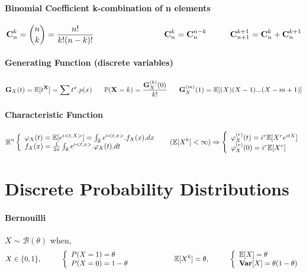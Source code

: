\documentclass[a4paper,10pt]{article}
\begin{document}
\paragraph{Binomial Coefficient k-combination of n elements}
\[
\textbf{C}^{k}_{n} = \binom{n}{k} = \frac{n!}{k!(n-k)!}
\hspace{30mm} \textbf{C}^{k}_{n} = \textbf{C}^{n-k}_{n} 
\hspace{10mm} \textbf{C}^{k+1}_{n+1} = \textbf{C}^{k}_{n} + \textbf{C}^{k+1}_{n} 
\]

\paragraph{Generating Function (discrete variables)}
\[
\textbf{G}_{X}(t)= \mathbb{E}[t^{\textbf{X}}] = \sum t^{x}.p(x)
\hspace{6mm} \mathbb{P}(\textbf{X}=k) = \frac{\textbf{G}_{X}^{(k)}(0)}{k!}
\hspace{6mm} \textbf{G}_{X}^{(m)}(1)  = \mathbb{E}[(X)(X-1)...(X-m+1)]
\]
\paragraph{Characteristic Function}
\[
\mathbb{R}^{n}
\left\{
\begin{array}{l}
\varphi_{X}(t)= \mathbb{E}[e^{i<t,X>}] = \int_{\mathbb{R}} e^{i<t,x>} . f_{X}(x).dx \\
f_{X}(x) = \frac{1}{2\pi}\int_{\mathbb{R}} e^{i<t,x>} . \varphi_{X}(t).dt
\end{array}\right. 
\hspace{5mm}
(\mathbb{E}[X^{k}]< \infty) \Rightarrow 
\left\{
\begin{array}{l}
\varphi_{X}^{(r)}(t)= i^{r}\mathbb{E}[X^{r}e^{itX}] \\
\varphi_{X}^{(r)}(0)= i^{r}\mathbb{E}[X^{r}]
\end{array}\right. 
\]


\section{Discrete Probability Distributions}

\paragraph{Bernouilli} $X\sim \mathcal{B}(\theta)$ when, 
\[
X \in \{0,1\} , 
\hspace{10mm}
\left\{
\begin{array}{l}
P(X=1)=\theta \\
P(X=0)=1-\theta
\end{array}\right.
\hspace{20mm}
\mathbb{E}[X^k]=\theta,
\hspace{10mm}
\left\{
\begin{array}{l}
\mathbb{E}[X]=\theta \\
\textbf{Var}[X]=\theta (1-\theta)
\end{array}\right.
\]
\end{document}
